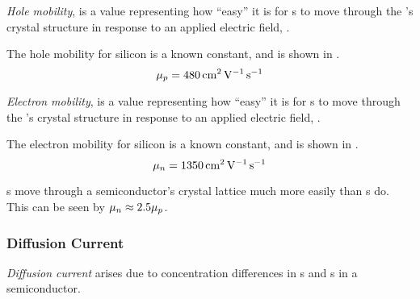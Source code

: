 \begin{definition}\label{def:Hole_Mobility}
  \emph{Hole mobility}, \HoleMobility{} is a value representing how ``easy'' it is for s to move through the 's crystal structure in response to an applied electric field, \EField{}.

  The hole mobility for  silicon is a known constant, and is shown in .
  \begin{equation}\label{eq:Hole_Mobility-Intrinsic_Silicon}
    \mu_{p} = \SI{480}{\centi\meter\squared\per\volt\per\second}
  \end{equation}
\end{definition}

\begin{definition}\label{def:Electron_Mobility}
  \emph{Electron mobility}, \ElectronMobility{} is a value representing how ``easy'' it is for s to move through the 's crystal structure in response to an applied electric field, \EField{}.

  The electron mobility for  silicon is a known constant, and is shown in .
  \begin{equation}\label{eq:Electron_Mobility-Intrinsic_Silicon}
    \mu_{n} = \SI{1350}{\centi\meter\squared\per\volt\per\second}
  \end{equation}

  \begin{remark}
    s move through a semiconductor's crystal lattice much more easily than s do.
    This can be seen by $\mu_{n} \approx 2.5 \mu_{p}$.
  \end{remark}
\end{definition}

\subsubsection{Diffusion Current}\label{subsubsec:Diffusion_Current}
\begin{definition}\label{def:Diffusion_Current}
  \emph{Diffusion current} arises due to concentration differences in s and s in a semiconductor.
\end{definition}

